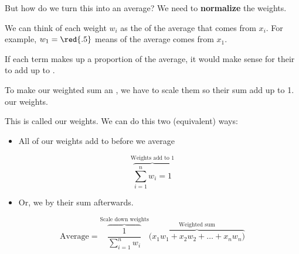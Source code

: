             But how do we turn this into an average? We need to \textbf{normalize} the weights.\\
            
            \begin{concept}
                We can think of each weight $w_i$ as the  of the average that comes from $x_i$. For example, $w_1=\red{.5}$ means  of the average comes from $x_1$.
                
                If each term makes up a proportion of the average, it would make sense for their  to add up to .
                
                To make our weighted sum an , we have to scale them so their sum add up to 1.  our weights.
                
                This is called  our weights. We can do this two (equivalent) ways:
                
                \begin{itemize}
                    \item All of our weights add to  before we average
                \end{itemize} 
                
                \begin{equation*}
                    \overbrace{
                        \sum_{i=1}^n w_i = 1
                    }^{\text{Weights add to 1}}
                \end{equation*}
                
                \begin{itemize}
                    \item Or, we  by their sum afterwards.
                \end{itemize}
                
                \begin{equation*}
                    \text{Average} = 
                    \overbrace{
                    \frac{1}{\sum_{i=1}^n w_i} 
                    }^{\text{Scale down weights}}
                    \overbrace{
                        \Bigg(
                        x_1w_1 + x_2w_2 + \dots + x_nw_n
                        \Bigg)
                    }^{\text{Weighted sum}}
                \end{equation*}
            \end{concept}
            
